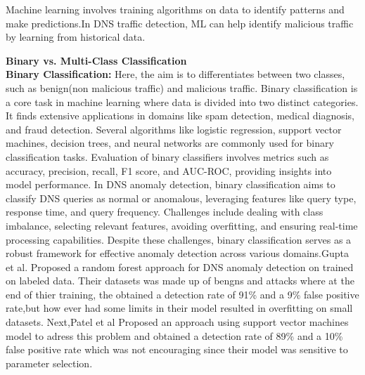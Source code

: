 Machine learning involves training algorithms on data to identify patterns and make predictions.In DNS traffic detection, ML can help identify malicious traffic by learning from historical data.

\textbf{Binary vs. Multi-Class Classification}\\
\textbf{Binary Classification:} Here, the aim is to  differentiates between two classes, such as benign(non malicious traffic) and malicious traffic.
Binary classification is a core task in machine learning where data is divided into two distinct categories. It finds extensive applications in domains like spam detection, medical diagnosis, and fraud detection. Several algorithms like logistic regression, support vector machines, decision trees, and neural networks are commonly used for binary classification tasks.
Evaluation of binary classifiers involves metrics such as accuracy, precision, recall, F1 score, and AUC-ROC, providing insights into model performance. In DNS anomaly detection, binary classification aims to classify DNS queries as normal or anomalous, leveraging features like query type, response time, and query frequency.
Challenges include dealing with class imbalance, selecting relevant features, avoiding overfitting, and ensuring real-time processing capabilities. Despite these challenges, binary classification serves as a robust framework for effective anomaly detection across various domains.Gupta et al.\cite{bilge2011exposure} Proposed a random forest approach for DNS anomaly detection on trained on labeled data. Their datasets was made up of bengns and attacks where at the end of thier training, the obtained a detection rate of 91\% and a 9\% false positive rate,but how ever had some limits in their model resulted in overfitting on small datasets. Next,Patel et al \cite{patel2022dns} Proposed an approach using support vector machines model to adress this problem and obtained a detection rate of 89\% and a 10\% false positive rate which was not encouraging since their model was sensitive to parameter selection.
